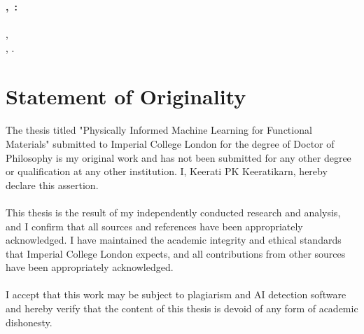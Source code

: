 \thispagestyle{empty}
\vspace*{\fill}
\begin{minipage}{.95\textwidth}
\textbf{\mylastname,~\myfirstname:}\\
\emph{\titleOfThesis}\\
\kindOfThesis, \myuni \\
\myplace, \myyear.
\end{minipage}

\cleardoublepage


\newpage
\thispagestyle{plain}
\section*{\Huge Statement of Originality}
\paragraph{}
\label{SoO}
The thesis titled "Physically Informed Machine Learning for Functional Materials" submitted to Imperial College London for the degree of Doctor of Philosophy is my original work and has not been submitted for any other degree or qualification at any other institution. I, Keerati PK Keeratikarn, hereby declare this assertion.
\paragraph{}
This thesis is the result of my independently conducted research and analysis, and I confirm that all sources and references have been appropriately acknowledged.  I have maintained the academic integrity and ethical standards that Imperial College London expects, and all contributions from other sources have been appropriately acknowledged.
\paragraph{}
I accept that this work may be subject to plagiarism and AI detection software and hereby verify that the content of this thesis is devoid of any form of academic dishonesty.

